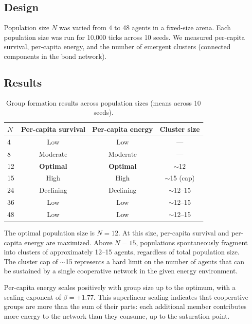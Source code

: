 \documentclass[12pt,a4paper]{article}
\begin{document}
\subsection{Design}

Population size $N$ was varied from 4 to 48 agents in a fixed-size arena. Each population size was run for 10{,}000 ticks across 10 seeds. We measured per-capita survival, per-capita energy, and the number of emergent clusters (connected components in the bond network).

\subsection{Results}

\begin{table}[H]
\centering
\caption{Group formation results across population sizes (means across 10 seeds).}
\label{tab:dunbar}
\begin{tabular}{@{}lccc@{}}
\toprule
\textbf{$N$} & \textbf{Per-capita survival} & \textbf{Per-capita energy} & \textbf{Cluster size} \\
\midrule
4   & Low  & Low  & --- \\
8   & Moderate & Moderate & --- \\
12  & \textbf{Optimal} & \textbf{Optimal} & $\sim$12 \\
15  & High & High & $\sim$15 (cap) \\
24  & Declining & Declining & $\sim$12--15 \\
36  & Low  & Low  & $\sim$12--15 \\
48  & Low  & Low  & $\sim$12--15 \\
\bottomrule
\end{tabular}
\end{table}

The optimal population size is $N = 12$. At this size, per-capita survival and per-capita energy are maximized. Above $N = 15$, populations spontaneously fragment into clusters of approximately 12--15 agents, regardless of total population size. The cluster cap of $\sim$15 represents a hard limit on the number of agents that can be sustained by a single cooperative network in the given energy environment.

Per-capita energy scales positively with group size up to the optimum, with a scaling exponent of $\beta = +1.77$. This superlinear scaling indicates that cooperative groups are more than the sum of their parts: each additional member contributes more energy to the network than they consume, up to the saturation point.
\end{document}
